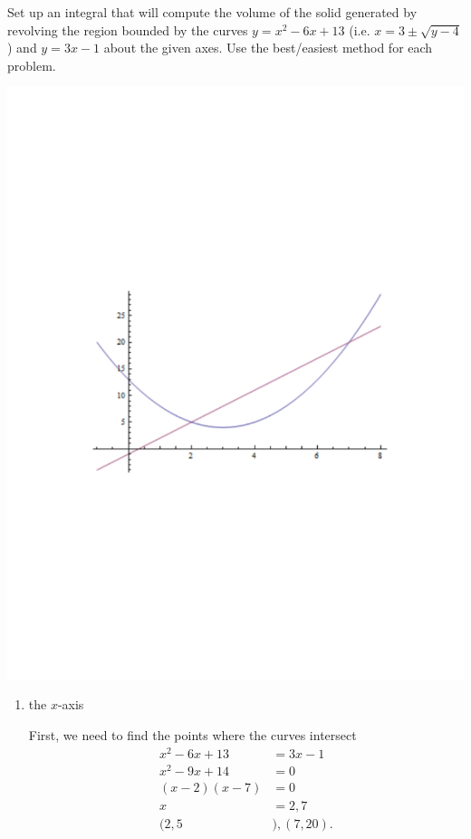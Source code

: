 \documentclass[handout]{ximera}
\begin{document}
\begin{problem}
Set up an integral that will compute the volume of the solid generated by revolving the region bounded by the curves $y=x^2-6x+13$ (i.e. $x = 3 \pm \sqrt{y-4}$) and $y=3x-1$ about the given axes.  Use the best/easiest method for each problem.

\begin{image}
\includegraphics[trim= 170 270 150 280, scale=0.8]{Figure6-4-1.pdf}
\end{image}

	\begin{enumerate}
		\item  the $x$-axis
		\begin{freeResponse}
		First, we need to find the points where the curves intersect
			\begin{align*}
			x^2 - 6x + 13 &= 3x - 1  \\
			x^2 - 9x + 14 &= 0  \\
			(x-2)(x-7) &= 0  \\
			x &= 2, 7  \\
			(2,5&), (7,20).
			\end{align*}
		

\end{freeResponse}
\end{enumerate}
\end{problem}
\end{document}
